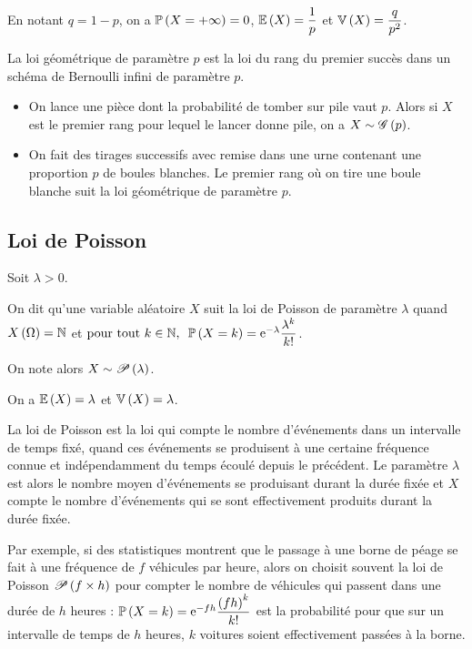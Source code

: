 En notant \(q=1-p\), on a \(\mathbb{P}\left(X=+\infty\right)=0\), \(\operatorname{\mathbb{E}}\left(X\right)=\dfrac{1}{p}\) et \(\operatorname{\mathbb{V}}\left(X\right)=\dfrac{q}{p^2}\).

\begin{prop}
La loi géométrique de paramètre \(p\) est la loi du rang du premier succès dans un schéma de Bernoulli infini de paramètre \(p\).
\end{prop}

\begin{ex}
\begin{itemize}
    \item On lance une pièce dont la probabilité de tomber sur pile vaut \(p\). Alors si \(X\) est le premier rang pour lequel le lancer donne pile, on a \(X\sim\mathscr{G}\left(p\right)\). \\
    \item On fait des tirages successifs avec remise dans une urne contenant une proportion \(p\) de boules blanches. Le premier rang où on tire une boule blanche suit la loi géométrique de paramètre \(p\).
\end{itemize}
\end{ex}

\subsection{Loi de Poisson}

\begin{defi}
Soit \(\lambda>0\).

On dit qu'une variable aléatoire \(X\) suit la loi de Poisson de paramètre \(\lambda\) quand \(X\left(\Omega\right)=\mathbb{N}\) et \(\quantifs{\tpt k\in\N}\proba{X=k}=\e{-\lambda}\dfrac{\lambda^k}{k!}\).

On note alors \(X\sim\mathscr{P}\left(\lambda\right)\).
\end{defi}

On a \(\operatorname{\mathbb{E}}\left(X\right)=\lambda\) et \(\operatorname{\mathbb{V}}\left(X\right)=\lambda\).

La loi de Poisson est la loi qui compte le nombre d'événements dans un intervalle de temps fixé, quand ces événements se produisent à une certaine fréquence connue et indépendamment du temps écoulé depuis le précédent. Le paramètre \(\lambda\) est alors le nombre moyen d'événements se produisant durant la durée fixée et \(X\) compte le nombre d'événements qui se sont effectivement produits durant la durée fixée.

Par exemple, si des statistiques montrent que le passage à une borne de péage se fait à une fréquence de \(f\) véhicules par heure, alors on choisit souvent la loi de Poisson \(\mathscr{P}\left(f\times h\right)\) pour compter le nombre de véhicules qui passent dans une durée de \(h\) heures : \(\mathbb{P}\left(X=k\right)=\mathrm{e}^{-fh}\dfrac{\left(fh\right)^k}{k!}\) est la probabilité pour que sur un intervalle de temps de \(h\) heures, \(k\) voitures soient effectivement passées à la borne.

